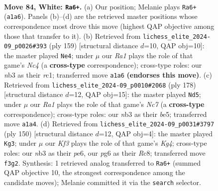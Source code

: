 \documentclass[11pt]{article}
\begin{document}
\clearpage

\begin{figure}[p]\centering
\begin{subfigure}{0.46\textwidth}\centering
\resizebox{\linewidth}{!}{%
\newchessgame
\chessboard[
  setfen={8/7P/4k1p1/5p2/5P2/1n3K2/8/R7 w - - 1 84},
  showmover=false,
  pgfstyle=straightmove, color=movearrow, markmove={a1-a6}
]}
\caption{}
\end{subfigure}\hfill
\begin{subfigure}{0.46\textwidth}\centering
\resizebox{\linewidth}{!}{%
\newchessgame
\chessboard[
  setfen={8/8/5k2/2n2p1p/7P/6P1/6K1/2R5 b - - 35 80},
  showmover=false,
  pgfstyle=straightmove, color=movearrow, markmove={c5-e4}
]}
\caption{}
\end{subfigure}
\\[4pt]
\begin{subfigure}{0.46\textwidth}\centering
\resizebox{\linewidth}{!}{%
\newchessgame
\chessboard[
  setfen={8/2N5/6k1/4bp2/4p3/4P3/4K3/8 w - - 34 90},
  showmover=false,
  pgfstyle=straightmove, color=movearrow, markmove={c7-d5}
]}
\caption{}
\end{subfigure}\hfill
\begin{subfigure}{0.46\textwidth}\centering
\resizebox{\linewidth}{!}{%
\newchessgame
\chessboard[
  setfen={2R5/6k1/4p1p1/8/3r2KP/8/8/8 w - - 45 76},
  showmover=false,
  pgfstyle=straightmove, color=movearrow, markmove={g4-g3}
]}
\caption{}
\end{subfigure}
\caption{\textbf{Move 84, White: \texttt{Ra6+}.} (a) Our position; Melanie plays \texttt{Ra6+} (\texttt{a1a6}). Panels (b)--(d) are the retrieved master positions whose correspondence most drove this move (highest QAP objective among those that transfer to it). (b) Retrieved from \texttt{lichess\_elite\_2024-09\_p0026\#393} (ply 159) [structural distance $d$=10, QAP obj=10]: the master played \texttt{Ne4}; under $\mu$ our \emph{Ra1} plays the role of that game's \emph{Nc4} (a \textbf{cross-type} correspondence); cross-type roles: our \emph{n}b3 as their \emph{r}c1; transferred move \texttt{a1a6} \textbf{(endorses this move)}. (c) Retrieved from \texttt{lichess\_elite\_2024-09\_p0010\#2068} (ply 178) [structural distance $d$=12, QAP obj=15]: the master played \texttt{Nd5}; under $\mu$ our \emph{Ra1} plays the role of that game's \emph{Nc7} (a \textbf{cross-type} correspondence); cross-type roles: our \emph{n}b3 as their \emph{b}e5; transferred move \texttt{a1a4}. (d) Retrieved from \texttt{lichess\_elite\_2024-09\_p0031\#3797} (ply 150) [structural distance $d$=12, QAP obj=4]: the master played \texttt{Kg3}; under $\mu$ our \emph{Kf3} plays the role of that game's \emph{Kg4}; cross-type roles: our \emph{n}b3 as their \emph{p}e6, our \emph{p}g6 as their \emph{R}c8; transferred move \texttt{f3g2}. Synthesis: 1 retrieved analog transferred to \texttt{Ra6+} (summed QAP objective 10, the strongest correspondence among the candidate moves); Melanie committed it via the \texttt{search} selector.}
\label{fig:thought-m166}
\end{figure}
\end{document}
